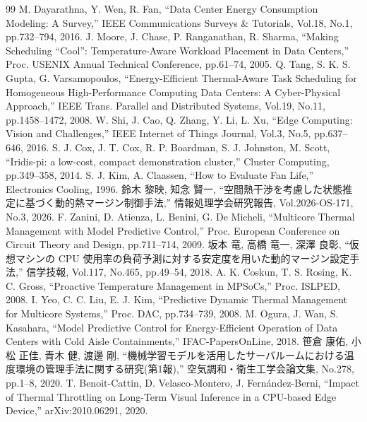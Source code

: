 \documentclass[10pt,uplatex,dvipdfmx,twocolumn]{jsarticle}
\begin{document}
\footnotesize{
\begin{thebibliography}{99}
  \setlength{\itemsep}{0pt}
   M. Dayarathna, Y. Wen, R. Fan, ``Data Center Energy Consumption Modeling: A Survey,'' IEEE Communications Surveys \& Tutorials, Vol.18, No.1, pp.732--794, 2016.
   J. Moore, J. Chase, P. Ranganathan, R. Sharma, ``Making Scheduling ``Cool'': Temperature-Aware Workload Placement in Data Centers,'' Proc. USENIX Annual Technical Conference, pp.61--74, 2005.
   Q. Tang, S. K. S. Gupta, G. Varsamopoulos, ``Energy-Efficient Thermal-Aware Task Scheduling for Homogeneous High-Performance Computing Data Centers: A Cyber-Physical Approach,'' IEEE Trans. Parallel and Distributed Systems, Vol.19, No.11, pp.1458--1472, 2008.
   W. Shi, J. Cao, Q. Zhang, Y. Li, L. Xu, ``Edge Computing: Vision and Challenges,'' IEEE Internet of Things Journal, Vol.3, No.5, pp.637--646, 2016.
   S. J. Cox, J. T. Cox, R. P. Boardman, S. J. Johnston, M. Scott, ``Iridis-pi: a low-cost, compact demonstration cluster,'' Cluster Computing, pp.349--358, 2014.
   S. J. Kim, A. Claassen, ``How to Evaluate Fan Life,'' Electronics Cooling, 1996.
   鈴木 黎映, 知念 賢一, ``空間熱干渉を考慮した状態推定に基づく動的熱マージン制御手法,'' 情報処理学会研究報告, Vol.2026-OS-171, No.3, 2026.
   F. Zanini, D. Atienza, L. Benini, G. De Micheli, ``Multicore Thermal Management with Model Predictive Control,'' Proc. European Conference on Circuit Theory and Design, pp.711--714, 2009.
   坂本 竜, 高橋 竜一, 深澤 良彰, ``仮想マシンの CPU 使用率の負荷予測に対する安定度を用いた動的マージン設定手法,'' 信学技報, Vol.117, No.465, pp.49--54, 2018.
   A. K. Coskun, T. S. Rosing, K. C. Gross, ``Proactive Temperature Management in MPSoCs,'' Proc. ISLPED, 2008.
   I. Yeo, C. C. Liu, E. J. Kim, ``Predictive Dynamic Thermal Management for Multicore Systems,'' Proc. DAC, pp.734--739, 2008.
   M. Ogura, J. Wan, S. Kasahara, ``Model Predictive Control for Energy-Efficient Operation of Data Centers with Cold Aisle Containments,'' IFAC-PapersOnLine, 2018.
   笹倉 康佑, 小松 正佳, 青木 健, 渡邊 剛, ``機械学習モデルを活用したサーバルームにおける温度環境の管理手法に関する研究(第1報),'' 空気調和・衛生工学会論文集, No.278, pp.1--8, 2020.
   T. Benoit-Cattin, D. Velasco-Montero, J. Fern\'{a}ndez-Berni, ``Impact of Thermal Throttling on Long-Term Visual Inference in a CPU-based Edge Device,'' arXiv:2010.06291, 2020.
\end{thebibliography}
}
\end{document}
